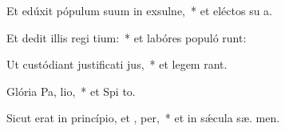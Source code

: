 \item Et edúxit pópulum suum in exsulne,~* et eléctos su  a.
\item Et dedit illis regi tium:~* et labóres populó runt:
\item Ut custódiant justificati jus,~* et legem  rant.
\item Glória Pa,  lio,~* et Spi to.
\item Sicut erat in princípio, et ,  per,~* et in sǽcula sæ. men.
